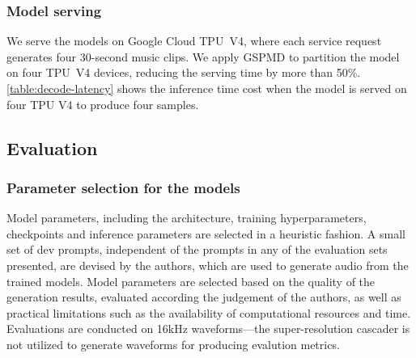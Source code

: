 \documentclass[nohyperref]{article}
\theoremstyle{plain}
\theoremstyle{definition}
\theoremstyle{remark}
\begin{document}
\subsubsection{Model serving}
We serve the models on Google Cloud TPU~V4, where each service request generates four 30-second music clips. We apply GSPMD \cite{gspmd} to partition the model on four TPU~V4 devices, reducing the serving time by more than 50\%. \cref{table:decode-latency} shows the inference time cost when the model is served on four TPU V4 to produce four samples.

\begin{table}
\caption{Inference time cost on four TPU~V4 for four samples.}
\vskip 0.05in
  \label{table:decode-latency}
  \centering
\vskip-0.2in
\end{table}

\subsection{Evaluation}

\subsubsection{Parameter selection for the models}
\label{ss:model-parameter-selection}

Model parameters, including the architecture, training hyperparameters, checkpoints and inference parameters are selected in a heuristic fashion. A small set of dev prompts, independent of the prompts in any of the evaluation sets presented, are devised by the authors, which are used to generate audio from the trained models. Model parameters are selected based on the quality of the generation results, evaluated according the judgement of the authors, as well as practical limitations such as the availability of computational resources and time. Evaluations are conducted on 16kHz waveforms---the super-resolution cascader is not utilized to generate waveforms for producing evalution metrics.
\end{document}
